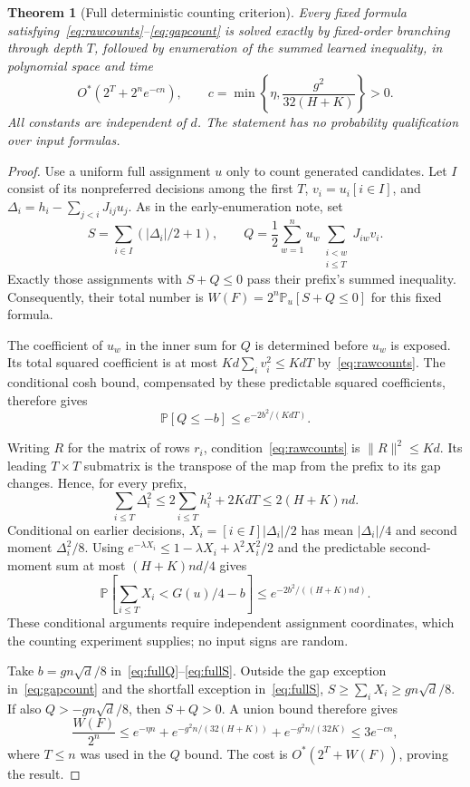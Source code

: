 \documentclass[11pt,a4paper]{article}
\newtheorem{theorem}{Theorem}
\newcommand{\Ostar}{O^{*}}
\newcommand{\Prb}{\mathbb P}
\begin{document}
\begin{theorem}[Full deterministic counting criterion]\label{thm:full}
Every fixed formula satisfying~\eqref{eq:rawcounts}--\eqref{eq:gapcount}
is solved exactly by fixed-order branching through depth $T$, followed
by enumeration of the summed learned inequality, in polynomial space and
time
\[
 \Ostar(2^T+2^n e^{-cn}),\qquad
 c=\min\left\{\eta,\frac{g^2}{32(H+K)}\right\}>0.
\]
All constants are independent of $d$. The statement has no probability
qualification over input formulas.
\end{theorem}
\begin{proof}
Use a uniform full assignment $u$ only to count generated candidates.
Let $I$ consist of its nonpreferred decisions among the first $T$,
$v_i=u_i[i\in I]$, and $\Delta_i=h_i-\sum_{j<i}J_{ij}u_j$.
As in the early-enumeration note, set
\[
 S=\sum_{i\in I}(|\Delta_i|/2+1),\qquad
 Q=\frac12\sum_{w=1}^n u_w\sum_{\substack{i<w\\i\le T}}J_{iw}v_i.
\]
Exactly those assignments with $S+Q\le0$ pass their prefix's summed
inequality. Consequently, their total number is
$W(F)=2^n\Prb_u[S+Q\le0]$ for this fixed formula.

The coefficient of $u_w$ in the inner sum for $Q$ is determined before
$u_w$ is exposed. Its total squared coefficient is at most
$Kd\sum_iv_i^2\le KdT$ by~\eqref{eq:rawcounts}. The conditional
cosh bound, compensated by these predictable squared coefficients,
therefore gives
\begin{equation}
 \Prb[Q\le-b]\le e^{-2b^2/(KdT)}.                  \label{eq:fullQ}
\end{equation}

Writing $R$ for the matrix of rows $r_i$, condition~\eqref{eq:rawcounts}
is $\|R\|^2\le Kd$. Its leading $T\times T$ submatrix is the transpose
of the map from the prefix to its gap changes. Hence, for every prefix,
\[
 \sum_{i\le T}\Delta_i^2
 \le2\sum_{i\le T}h_i^2+2KdT\le2(H+K)nd.
\]
Conditional on earlier decisions, $X_i=[i\in I]|\Delta_i|/2$ has mean
$|\Delta_i|/4$ and second moment $\Delta_i^2/8$. Using
$e^{-\lambda X_i}\le1-\lambda X_i+\lambda^2X_i^2/2$ and the predictable
second-moment sum at most $(H+K)nd/4$ gives
\begin{equation}
 \Prb\left[\sum_{i\le T}X_i<G(u)/4-b\right]
       \le e^{-2b^2/((H+K)nd)}.                     \label{eq:fullS}
\end{equation}
These conditional arguments require independent assignment coordinates,
which the counting experiment supplies; no input signs are random.

Take $b=gn\sqrt d/8$ in~\eqref{eq:fullQ}--\eqref{eq:fullS}.
Outside the gap exception in~\eqref{eq:gapcount} and the shortfall
exception in~\eqref{eq:fullS}, $S\ge\sum_iX_i\ge gn\sqrt d/8$.
If also $Q>-gn\sqrt d/8$, then $S+Q>0$. A union bound therefore gives
\[
 \frac{W(F)}{2^n}\le
 e^{-\eta n}+e^{-g^2n/(32(H+K))}+e^{-g^2n/(32K)}
 \le3e^{-cn},
\]
where $T\le n$ was used in the $Q$ bound. The cost is
$\Ostar(2^T+W(F))$, proving the result.
\end{proof}
\end{document}
